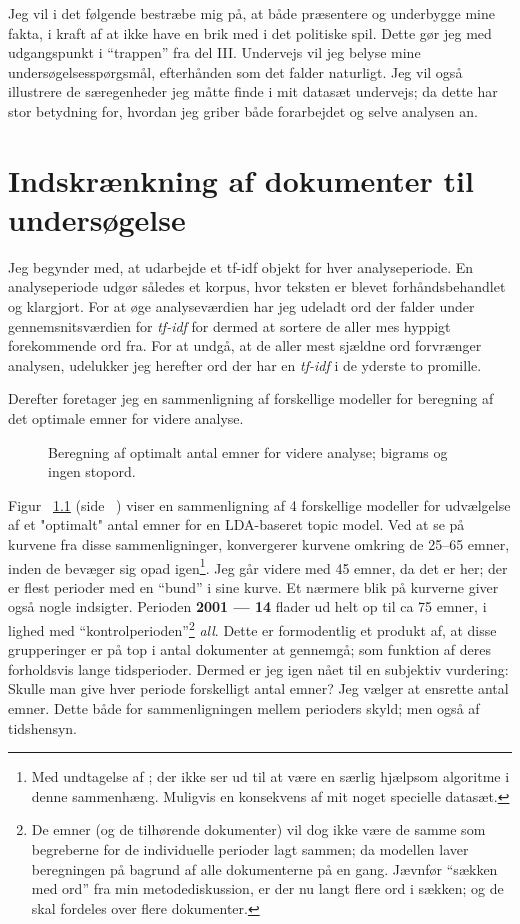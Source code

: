 Jeg vil i det følgende bestræbe mig på, at både præsentere og underbygge mine fakta, i kraft af at ikke have en brik med i det politiske spil.
Dette gør jeg med udgangspunkt i “trappen” fra del III.
Undervejs vil jeg belyse mine undersøgelsesspørgsmål, efterhånden som det falder naturligt.
Jeg vil også illustrere de særegenheder jeg måtte finde i mit datasæt undervejs; da dette har stor betydning for, hvordan jeg griber både forarbejdet og selve analysen an.

\chapter{Indskrænkning af dokumenter til undersøgelse}

Jeg begynder med, at udarbejde et tf-idf objekt for hver analyseperiode.
En analyseperiode udgør således et korpus, hvor teksten er blevet forhåndsbehandlet og klargjort.
For at øge analyseværdien har jeg udeladt ord der falder under gennemsnitsværdien for \textit{tf-idf} for dermed at sortere de aller mes hyppigt forekommende ord fra.
For at undgå, at de aller mest sjældne ord forvrænger analysen, udelukker jeg herefter ord der har en \textit{tf-idf} i de yderste to promille.

Derefter foretager jeg en sammenligning af forskellige modeller for beregning af det optimale emner for videre analyse.

\begin{figure}

\caption{Beregning af optimalt antal emner for videre analyse; bigrams og ingen stopord.}
\label{fig:modelsFull}
\end{figure}

Figur ~\ref{fig:modelsFull} (side ~\pageref{fig:modelsFull}) viser en sammenligning af 4 forskellige modeller for udvælgelse af et "optimalt" antal emner for en LDA-baseret topic model.
Ved at se på kurvene fra disse sammenligninger, konvergerer kurvene omkring de 25--65 emner, inden de bevæger sig opad igen\footnote{Med undtagelse af \autocite{deveaudAccurateEffectiveLatent2014}; der ikke ser ud til at være en særlig hjælpsom algoritme i denne sammenhæng. Muligvis en konsekvens af mit noget specielle datasæt.}.
Jeg går videre med 45 emner, da det er her; der er flest perioder med en “bund” i sine kurve.
Et nærmere blik på kurverne giver også nogle indsigter.
Perioden \textbf{2001 --- 14} flader ud helt op til ca 75 emner, i lighed med “kontrolperioden”\footnote{
De emner (og de tilhørende dokumenter) vil dog ikke være de samme som begreberne for de individuelle perioder lagt sammen; da modellen laver beregningen på bagrund af alle dokumenterne på en gang.
Jævnfør “sækken med ord” fra min metodediskussion, er der nu langt flere ord i sækken; og de skal fordeles over flere dokumenter.}
\textit{all}.
Dette er formodentlig et produkt af, at disse grupperinger er på top i antal dokumenter at gennemgå; som funktion af deres forholdsvis lange tidsperioder.
Dermed er jeg igen nået til en subjektiv vurdering:
Skulle man give hver periode forskelligt antal emner?
Jeg vælger at ensrette antal emner. 
Dette både for sammenligningen mellem perioders skyld;
men også af tidshensyn.

